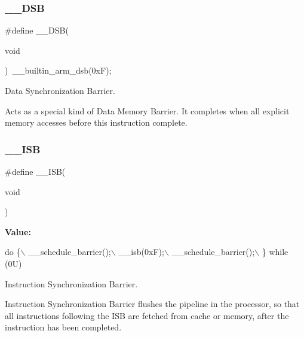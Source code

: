 \subsubsection{\texorpdfstring{\+\_\+\+\_\+\+D\+SB}{\_\_DSB}\hspace{0.1cm}{\footnotesize\ttfamily [2/2]}}
{\footnotesize\ttfamily \#define \+\_\+\+\_\+\+D\+SB(\begin{DoxyParamCaption}\item[{}]{void }\end{DoxyParamCaption})~\+\_\+\+\_\+builtin\+\_\+arm\+\_\+dsb(0x\+F);}



Data Synchronization Barrier. 

Acts as a special kind of Data Memory Barrier. It completes when all explicit memory accesses before this instruction complete. \mbox{\label{group___c_m_s_i_s___core___instruction_interface_gaad233022e850a009fc6f7602be1182f6}} 
\subsubsection{\texorpdfstring{\+\_\+\+\_\+\+I\+SB}{\_\_ISB}\hspace{0.1cm}{\footnotesize\ttfamily [1/2]}}
{\footnotesize\ttfamily \#define \+\_\+\+\_\+\+I\+SB(\begin{DoxyParamCaption}\item[{}]{void }\end{DoxyParamCaption})}

{\bfseries Value\+:}
\begin{DoxyCode}
\textcolor{keywordflow}{do} \{\(\backslash\)
                   \_\_schedule\_barrier();\(\backslash\)
                   \_\_isb(0xF);\(\backslash\)
                   \_\_schedule\_barrier();\(\backslash\)
                \} \textcolor{keywordflow}{while} (0U)
\end{DoxyCode}


Instruction Synchronization Barrier. 

Instruction Synchronization Barrier flushes the pipeline in the processor, so that all instructions following the I\+SB are fetched from cache or memory, after the instruction has been completed. \mbox{\label{group___c_m_s_i_s___core___instruction_interface_gaad233022e850a009fc6f7602be1182f6}} 
